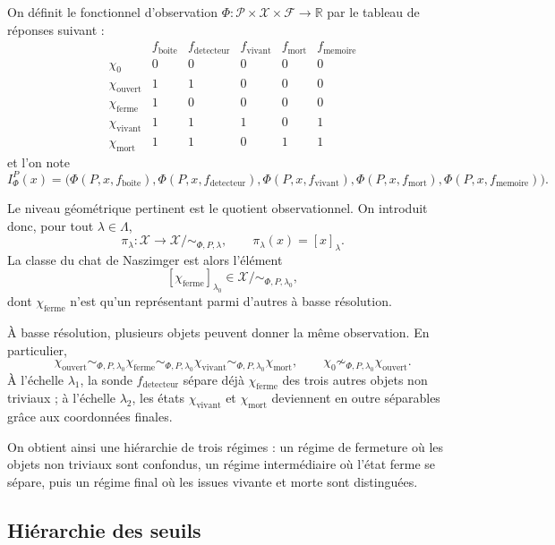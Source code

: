 \documentclass[11pt,a4paper,openany]{book}
\begin{document}
On définit le fonctionnel d'observation \(\Phi:\mathcal P\times\mathcal X\times\mathcal F\to\mathbb R\) par le tableau de réponses suivant :
\[
\begin{array}{c|ccccc}
& f_{\mathrm{boite}} & f_{\mathrm{detecteur}} & f_{\mathrm{vivant}} & f_{\mathrm{mort}} & f_{\mathrm{memoire}} \\ \hline
\chi_0 & 0 & 0 & 0 & 0 & 0 \\
\chi_{\mathrm{ouvert}} & 1 & 1 & 0 & 0 & 0 \\
\chi_{\mathrm{ferme}} & 1 & 0 & 0 & 0 & 0 \\
\chi_{\mathrm{vivant}} & 1 & 1 & 1 & 0 & 1 \\
\chi_{\mathrm{mort}} & 1 & 1 & 0 & 1 & 1
\end{array}
\]
et l'on note
\[
I_\Phi^P(x)=\bigl(\Phi(P,x,f_{\mathrm{boite}}),\Phi(P,x,f_{\mathrm{detecteur}}),\Phi(P,x,f_{\mathrm{vivant}}),\Phi(P,x,f_{\mathrm{mort}}),\Phi(P,x,f_{\mathrm{memoire}})\bigr).
\]

Le niveau géométrique pertinent est le quotient observationnel. On introduit donc, pour tout \(\lambda\in\Lambda\),
\[
\pi_\lambda:\mathcal X\longrightarrow \mathcal X/{\sim_{\Phi,P,\lambda}},
\qquad
\pi_\lambda(x)=[x]_\lambda.
\]
La classe du chat de Naszimger est alors l'élément
\[
[\chi_{\mathrm{ferme}}]_{\lambda_0}\in \mathcal X/{\sim_{\Phi,P,\lambda_0}},
\]
dont \(\chi_{\mathrm{ferme}}\) n'est qu'un représentant parmi d'autres à basse résolution.

À basse résolution, plusieurs objets peuvent donner la même observation. En particulier,
\[
\chi_{\mathrm{ouvert}} \sim_{\Phi,P,\lambda_0} \chi_{\mathrm{ferme}}
\sim_{\Phi,P,\lambda_0} \chi_{\mathrm{vivant}}
\sim_{\Phi,P,\lambda_0} \chi_{\mathrm{mort}},
\qquad
\chi_0 \not\sim_{\Phi,P,\lambda_0} \chi_{\mathrm{ouvert}}.
\]
À l'échelle \(\lambda_1\), la sonde \(f_{\mathrm{detecteur}}\) sépare déjà \(\chi_{\mathrm{ferme}}\) des trois autres objets non triviaux ; à l'échelle \(\lambda_2\), les états \(\chi_{\mathrm{vivant}}\) et \(\chi_{\mathrm{mort}}\) deviennent en outre séparables grâce aux coordonnées finales.

On obtient ainsi une hiérarchie de trois régimes : un régime de fermeture où les objets non triviaux sont confondus, un régime intermédiaire où l'état ferme se sépare, puis un régime final où les issues vivante et morte sont distinguées.

\subsection{Hiérarchie des seuils}
\end{document}
